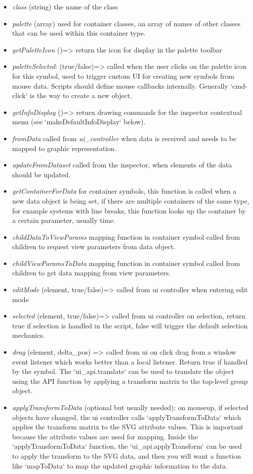 \documentclass{article}
\def\uicontroller{\textit{ui\_controller}\xspace}
\begin{document}
\begin{itemize}\itemsep0pt 
\item \textit{class} (string) the name of the class
\item \textit{palette} (array) used for container classes, an array of names of other classes that can be used within this container type.
\item \textit{getPaletteIcon} ()=> return the icon for display in the palette toolbar
\item \textit{paletteSelected}: (true/false)=> called when the user clicks on the palette icon for this symbol, used to trigger custom UI for creating new symbols from mouse data. Scripts should define mouse callbacks internally. Generally `cmd-click` is the way to create a new object.
\item \textit{getInfoDisplay} ()=> return drawing commands for the inspector contextual menu (see `makeDefaultInfoDisplay` below).
\item \textit{fromData} called from \uicontroller when data is received and needs to be mapped to graphic representation.
\item \textit{updateFromDataset} called from the inspector, when elements of the data should be updated.
\item \textit{getContainerForData} for container symbols, this function is called when a new data object is being set, if there are multiple containers of the same type, for example systems with line breaks, this function looks up the container by a certain parameter, usually time.
\item \textit{childDataToViewParams} mapping function in container symbol called from children to request view parameters from data object.
\item \textit{childViewParamsToData} mapping function in container symbol called from children to get data mapping from view parameters.
\item \textit{editMode} (element, true/false)=> called from ui controller when entering edit mode
\item \textit{selected} (element, true/false)=> called from ui controller on selection, return true if selection is handled in the script, false will trigger the default selection mechanics.
\item \textit{drag} (element, delta\_pos) => called from ui on click drag from a window event listener which works better than a local listener. Return true if handled by the symbol. The `ui\_api.translate` can be used to translate the object using the API function by applying a transform matrix to the top-level group object. 
\item \textit{applyTransformToData} (optional but usually needed): on mouseup, if selected objects have changed, the ui controller calls `applyTransformToData` which applies the transform matrix to the SVG attribute values. This is important because the attribute values are used for mapping. Inside the `applyTransformToData` function, the `ui\_api.applyTransform` can be used to apply the transform to the SVG data, and then you will want a function like `mapToData` to map the updated graphic information to the data.
\end{itemize}
\end{document}
